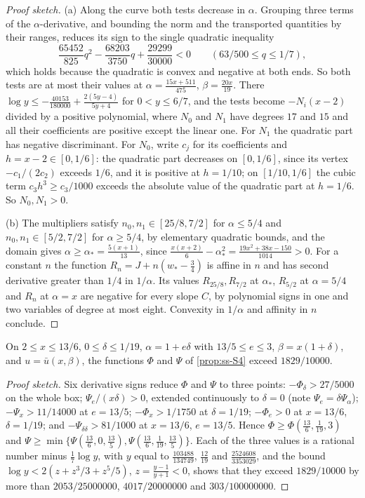 \begin{proof}[Proof sketch]
(a) Along the curve both tests decrease in $\alpha$. Grouping three terms of the
$\alpha$-derivative, and bounding the norm and the transported quantities by their ranges,
reduces its sign to the single quadratic inequality
\[
  \frac{65452}{825}q^2-\frac{68203}{3750}q+\frac{29299}{30000}<0
  \qquad(63/500\le q\le1/7),
\]
which holds because the quadratic is convex and negative at both ends. So
both tests are at most their values at $\alpha=\frac{15x+511}{475}$, $\beta=\frac{20x}{19}$. There
$\log y\le-\frac{40153}{180000}+\frac{2(5y-4)}{5y+4}$ for $0<y\le6/7$, and the tests become
$-N_i(x-2)$ divided by a positive polynomial, where $N_0$ and $N_1$ have degrees $17$ and $15$ and
all their coefficients are positive except the linear one. For $N_1$ the quadratic part
has negative discriminant. For $N_0$, write $c_j$ for its coefficients and $h=x-2\in[0,1/6]$: the
quadratic part decreases on $[0,1/6]$, since its vertex $-c_1/(2c_2)$ exceeds $1/6$, and it is
positive at $h=1/10$; on $[1/10,1/6]$ the cubic term $c_3h^3\ge c_3/1000$ exceeds the absolute
value of the quadratic part at $h=1/6$. So $N_0,N_1>0$.

(b) The multipliers satisfy $n_0,n_1\in[25/8,7/2]$ for $\alpha\le5/4$ and $n_0,n_1\in[5/2,7/2]$ for
$\alpha\ge5/4$, by elementary quadratic bounds, and the domain gives
$\alpha\ge\alpha_*=\frac{5(x+1)}{13}$, since $\frac{x(x+2)}6-\alpha_*^2=\frac{19x^2+38x-150}{1014}>0$.
For a constant $n$ the function $R_n=J+n(w_*-\frac34)$ is affine in $n$ and has second derivative
greater than $1/4$ in $1/\alpha$. Its values $R_{25/8},R_{7/2}$ at $\alpha_*$, $R_{5/2}$ at
$\alpha=5/4$ and $R_n$ at $\alpha=x$ are negative for every slope $C$, by polynomial signs in one
and two variables of degree at most eight. Convexity in $1/\alpha$ and
affinity in $n$ conclude.
\end{proof}

\begin{proposition}\label{prop:ss-face-S4}
On $2\le x\le13/6$, $0\le\delta\le1/19$, $\alpha=1+e\delta$ with $13/5\le e\le3$,
$\beta=x(1+\delta)$, and $u=\bar u(x,\beta)$, the functions $\Phi$ and $\Psi$ of
\cref{prop:ss-S4} exceed $1829/10000$.
\end{proposition}

\begin{proof}[Proof sketch]
Six derivative signs reduce $\Phi$ and $\Psi$ to three points:
$-\Phi_\delta>27/5000$ on the whole box; $\Psi_e/(x\delta)>0$, extended continuously to
$\delta=0$ (note $\Psi_e=\delta\Psi_\alpha$); $-\Psi_x>11/14000$ at $e=13/5$; $-\Phi_x>1/1750$ at
$\delta=1/19$; $-\Phi_e>0$ at $x=13/6$, $\delta=1/19$; and $-\Psi_{\delta\delta}>81/1000$ at
$x=13/6$, $e=13/5$. Hence $\Phi\ge\Phi(\frac{13}6,\frac1{19},3)$ and
$\Psi\ge\min\{\Psi(\frac{13}6,0,\frac{13}5),\Psi(\frac{13}6,\frac1{19},\frac{13}5)\}$. Each of
the three values is a rational number minus $\frac17\log y$, with $y$ equal to
$\frac{103488}{134749}$, $\frac{12}{19}$ and $\frac{2524608}{3353029}$, and the bound
$\log y<2(z+z^3/3+z^5/5)$, $z=\frac{y-1}{y+1}<0$, shows that they exceed $1829/10000$ by more than
$2053/25000000$, $4017/20000000$ and $303/100000000$.
\end{proof}

